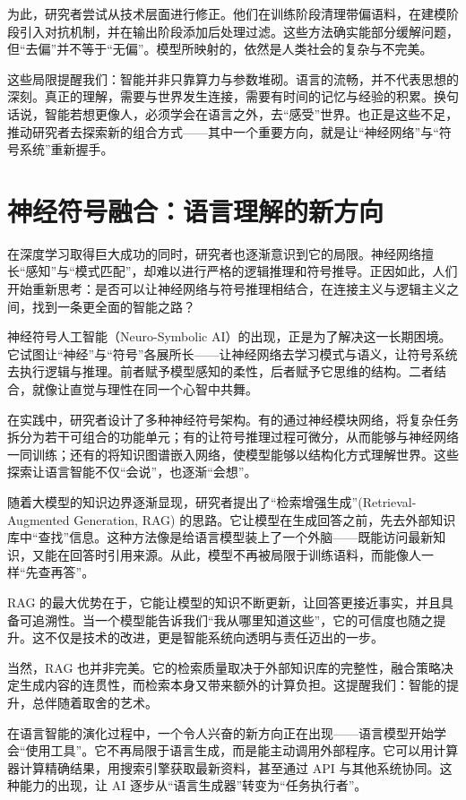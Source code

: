 为此，研究者尝试从技术层面进行修正。他们在训练阶段清理带偏语料，在建模阶段引入对抗机制，并在输出阶段添加后处理过滤。这些方法确实能部分缓解问题，但“去偏”并不等于“无偏”。模型所映射的，依然是人类社会的复杂与不完美。

这些局限提醒我们：智能并非只靠算力与参数堆砌。语言的流畅，并不代表思想的深刻。真正的理解，需要与世界发生连接，需要有时间的记忆与经验的积累。换句话说，智能若想更像人，必须学会在语言之外，去“感受”世界。也正是这些不足，推动研究者去探索新的组合方式——其中一个重要方向，就是让“神经网络”与“符号系统”重新握手。

\section{神经符号融合：语言理解的新方向}

在深度学习取得巨大成功的同时，研究者也逐渐意识到它的局限。神经网络擅长“感知”与“模式匹配”，却难以进行严格的逻辑推理和符号推导。正因如此，人们开始重新思考：是否可以让神经网络与符号推理相结合，在连接主义与逻辑主义之间，找到一条更全面的智能之路？

神经符号人工智能（Neuro-Symbolic AI）的出现，正是为了解决这一长期困境。它试图让“神经”与“符号”各展所长——让神经网络去学习模式与语义，让符号系统去执行逻辑与推理。前者赋予模型感知的柔性，后者赋予它思维的结构。二者结合，就像让直觉与理性在同一个心智中共舞。

在实践中，研究者设计了多种神经符号架构。有的通过神经模块网络，将复杂任务拆分为若干可组合的功能单元；有的让符号推理过程可微分，从而能够与神经网络一同训练；还有的将知识图谱嵌入网络，使模型能够以结构化方式理解世界。这些探索让语言智能不仅“会说”，也逐渐“会想”。

随着大模型的知识边界逐渐显现，研究者提出了“检索增强生成”(Retrieval-Augmented Generation, RAG) 的思路。它让模型在生成回答之前，先去外部知识库中“查找”信息。这种方法像是给语言模型装上了一个外脑——既能访问最新知识，又能在回答时引用来源。从此，模型不再被局限于训练语料，而能像人一样“先查再答”。

RAG 的最大优势在于，它能让模型的知识不断更新，让回答更接近事实，并且具备可追溯性。当一个模型能告诉我们“我从哪里知道这些”，它的可信度也随之提升。这不仅是技术的改进，更是智能系统向透明与责任迈出的一步。

当然，RAG 也并非完美。它的检索质量取决于外部知识库的完整性，融合策略决定生成内容的连贯性，而检索本身又带来额外的计算负担。这提醒我们：智能的提升，总伴随着取舍的艺术。

在语言智能的演化过程中，一个令人兴奋的新方向正在出现——语言模型开始学会“使用工具”。它不再局限于语言生成，而是能主动调用外部程序。它可以用计算器计算精确结果，用搜索引擎获取最新资料，甚至通过 API 与其他系统协同。这种能力的出现，让 AI 逐步从“语言生成器”转变为“任务执行者”。

